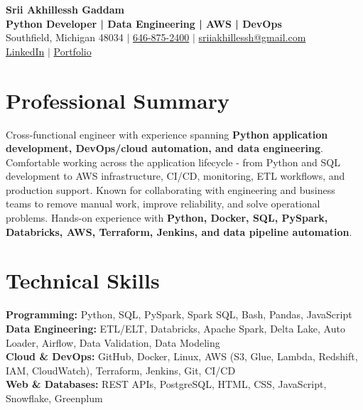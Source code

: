 \documentclass[letterpaper,10pt]{article}
\begin{document}
\fontsize{9.35pt}{10.45pt}\selectfont

\begin{center}
    {\LARGE \textbf{Srii Akhillessh Gaddam}} \\[-1pt]
    \textbf{Python Developer | Data Engineering | AWS | DevOps} \\[2pt]
    Southfield, Michigan 48034 $|$
    \href{tel:6468752400}{646-875-2400} $|$
    \href{mailto:sriiakhillessh@gmail.com}{sriiakhillessh@gmail.com} \\[1pt]
    \href{https://www.linkedin.com/in/srii-akhiilessh-gaddam-b48668191/}{LinkedIn} $|$
    \href{https://sriiakhillesshg.github.io/portfolio/}{Portfolio}
\end{center}
\vspace{-8pt}

\section{Professional Summary}
\small{Cross-functional engineer with experience spanning \textbf{Python application development, DevOps/cloud automation, and data engineering}. Comfortable working across the application lifecycle - from Python and SQL development to AWS infrastructure, CI/CD, monitoring, ETL workflows, and production support. Known for collaborating with engineering and business teams to remove manual work, improve reliability, and solve operational problems. Hands-on experience with \textbf{Python, Docker, SQL, PySpark, Databricks, AWS, Terraform, Jenkins, and data pipeline automation}.}

\section{Technical Skills}
\small{
\textbf{Programming:} Python, SQL, PySpark, Spark SQL, Bash, Pandas, JavaScript \\
\textbf{Data Engineering:} ETL/ELT, Databricks, Apache Spark, Delta Lake, Auto Loader, Airflow, Data Validation, Data Modeling \\
\textbf{Cloud \& DevOps:} GitHub, Docker, Linux, AWS (S3, Glue, Lambda, Redshift, IAM, CloudWatch), Terraform, Jenkins, Git, CI/CD \\
\textbf{Web \& Databases:} REST APIs, PostgreSQL, HTML, CSS, JavaScript, Snowflake, Greenplum
}
\end{document}
